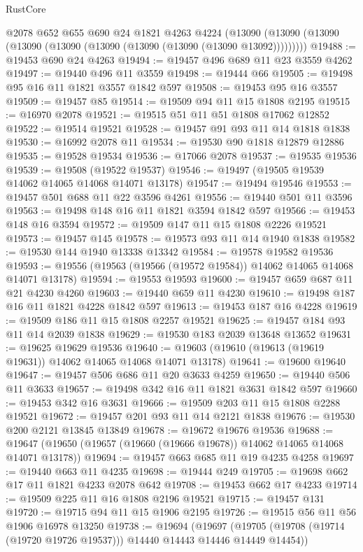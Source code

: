 \begin{lexlean}{RustCore}
\begin{coremodule}
    @2078
    @652
    @655
    @690
    @24
    @1821
    @4263
    @4224
    (@13090 (@13090 (@13090 (@13090 (@13090 (@13090 (@13090 (@13090 (@13090 @13092)))))))))
@19488 := @19453 @690 @24 @4263
@19494 := @19457 @496 @689 @11 @23 @3559 @4262
@19497 := @19440 @496 @11 @3559
@19498 := @19444 @66
@19505 := @19498 @95 @16 @11 @1821 @3557 @1842 @597
@19508 := @19453 @95 @16 @3557
@19509 := @19457 @85
@19514 := @19509 @94 @11 @15 @1808 @2195
@19515 := @16970 @2078
@19521 := @19515 @51 @11 @51 @1808 @17062 @12852
@19522 := @19514 @19521
@19528 := @19457 @91 @93 @11 @14 @1818 @1838
@19530 := @16992 @2078 @11
@19534 := @19530 @90 @1818 @12879 @12886
@19535 := @19528 @19534
@19536 := @17066 @2078
@19537 := @19535 @19536
@19539 := @19508 (@19522 @19537)
@19546 := @19497 (@19505 @19539 @14062 @14065 @14068 @14071 @13178)
@19547 := @19494 @19546
@19553 := @19457 @501 @688 @11 @22 @3596 @4261
@19556 := @19440 @501 @11 @3596
@19563 := @19498 @148 @16 @11 @1821 @3594 @1842 @597
@19566 := @19453 @148 @16 @3594
@19572 := @19509 @147 @11 @15 @1808 @2226 @19521
@19573 := @19457 @145
@19578 := @19573 @93 @11 @14 @1940 @1838
@19582 := @19530 @144 @1940 @13338 @13342
@19584 := @19578 @19582 @19536
@19593 := @19556 (@19563 (@19566 (@19572 @19584)) @14062 @14065 @14068 @14071 @13178)
@19594 := @19553 @19593
@19600 := @19457 @659 @687 @11 @21 @4230 @4260
@19603 := @19440 @659 @11 @4230
@19610 := @19498 @187 @16 @11 @1821 @4228 @1842 @597
@19613 := @19453 @187 @16 @4228
@19619 := @19509 @186 @11 @15 @1808 @2257 @19521
@19625 := @19457 @184 @93 @11 @14 @2039 @1838
@19629 := @19530 @183 @2039 @13648 @13652
@19631 := @19625 @19629 @19536
@19640 := @19603 (@19610 (@19613 (@19619 @19631)) @14062 @14065 @14068 @14071 @13178)
@19641 := @19600 @19640
@19647 := @19457 @506 @686 @11 @20 @3633 @4259
@19650 := @19440 @506 @11 @3633
@19657 := @19498 @342 @16 @11 @1821 @3631 @1842 @597
@19660 := @19453 @342 @16 @3631
@19666 := @19509 @203 @11 @15 @1808 @2288 @19521
@19672 := @19457 @201 @93 @11 @14 @2121 @1838
@19676 := @19530 @200 @2121 @13845 @13849
@19678 := @19672 @19676 @19536
@19688 := @19647 (@19650 (@19657 (@19660 (@19666 @19678)) @14062 @14065 @14068 @14071 @13178))
@19694 := @19457 @663 @685 @11 @19 @4235 @4258
@19697 := @19440 @663 @11 @4235
@19698 := @19444 @249
@19705 := @19698 @662 @17 @11 @1821 @4233 @2078 @642
@19708 := @19453 @662 @17 @4233
@19714 := @19509 @225 @11 @16 @1808 @2196 @19521
@19715 := @19457 @131
@19720 := @19715 @94 @11 @15 @1906 @2195
@19726 := @19515 @56 @11 @56 @1906 @16978 @13250
@19738 := @19694
    (@19697 (@19705 (@19708 (@19714 (@19720 @19726 @19537))) @14440 @14443 @14446 @14449 @14454))

\end{coremodule}
\end{lexlean}
